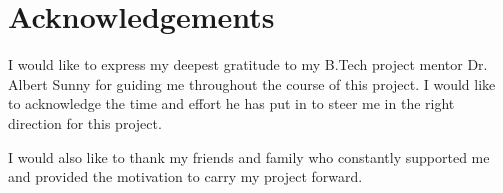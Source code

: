 \chapter*{\centering Acknowledgements}
\quad I would like to express my deepest gratitude to my B.Tech project mentor Dr. Albert Sunny for guiding me throughout the course of this project. I would like to acknowledge the time and effort he has put in to steer me in the right direction for this project. 

I would also like to thank my friends and family who constantly supported me and provided the motivation to carry my project forward.

